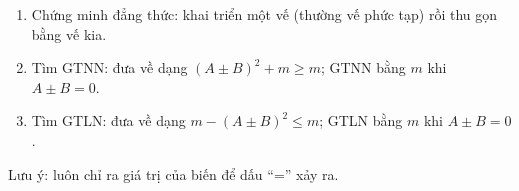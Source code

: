 \begin{enumerate}
\item Chứng minh đẳng thức: khai triển một vế (thường vế phức tạp) rồi thu gọn bằng vế kia.
\item Tìm GTNN: đưa về dạng $(A\pm B)^2+m\ge m$; GTNN bằng $m$ khi $A\pm B=0$.
\item Tìm GTLN: đưa về dạng $m-(A\pm B)^2\le m$; GTLN bằng $m$ khi $A\pm B=0$.
\end{enumerate}
Lưu ý: luôn chỉ ra giá trị của biến để dấu ``='' xảy ra.
